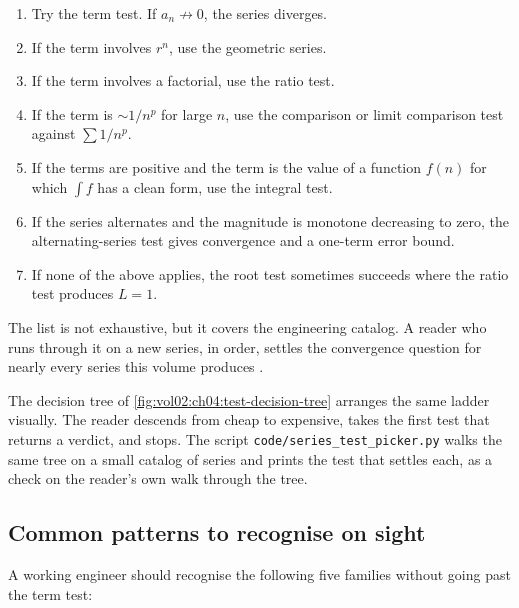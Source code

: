 \begin{enumerate}[leftmargin=*]
  \item Try the term test. If $a_{n} \not\to 0$, the series diverges.
  \item If the term involves $r^{n}$, use the geometric series.
  \item If the term involves a factorial, use the ratio test.
  \item If the term is $\sim 1/n^{p}$ for large $n$, use the comparison
    or limit comparison test against $\sum 1/n^{p}$.
  \item If the terms are positive and the term is the value of a
    function $f(n)$ for which $\int f$ has a clean form, use the
    integral test.
  \item If the series alternates and the magnitude is monotone
    decreasing to zero, the alternating-series test gives convergence
    and a one-term error bound.
  \item If none of the above applies, the root test sometimes
    succeeds where the ratio test produces $L = 1$.
\end{enumerate}

The list is not exhaustive, but it covers the engineering catalog. A
reader who runs through it on a new series, in order, settles the
convergence question for nearly every series this volume produces
\cite{text:strang2016,text:v2ch04-stewart-calculus-2015}.



The decision tree of \autoref{fig:vol02:ch04:test-decision-tree} arranges
the same ladder visually. The reader descends from cheap to expensive,
takes the first test that returns a verdict, and stops. The script
\texttt{code/series\_test\_picker.py} walks the same tree on a small
catalog of series and prints the test that settles each, as a check on
the reader's own walk through the tree.

\subsection{Common patterns to recognise on sight}

A working engineer should recognise the following five families
without going past the term test:

